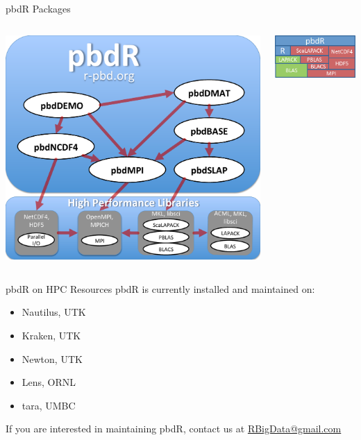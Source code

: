 \begin{frame}
  \begin{block}{pbdR Packages}
    \begin{center}
      \begin{columns}
        \begin{column}{.52\textwidth}
      \includegraphics[scale=.3]{../common/pics/pbdR-graph}
        \end{column}
        \hfill
        \begin{column}{.4\textwidth}
      \includegraphics[scale=.45]{../common/pics/libs}
        \end{column}
      \end{columns}
    \end{center}
  \end{block}
\end{frame}

\begin{frame}
  \begin{block}{pbdR on HPC Resources}
    pbdR is currently installed and maintained on:
    \begin{itemize}
      \item Nautilus, UTK
      \item Kraken, UTK
      \item Newton, UTK
      \item Lens, ORNL
      \item tara, UMBC
    \end{itemize}
    If you are interested in maintaining pbdR, contact us at 
\url{RBigData@gmail.com}
  \end{block}
\end{frame}

